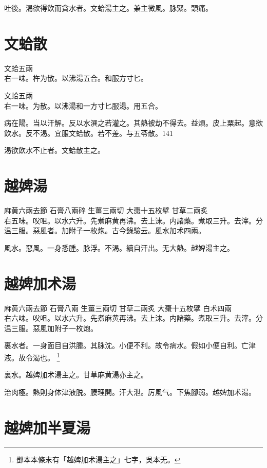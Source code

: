 吐後。渴欲得飲而貪水者。文蛤湯主之。兼主微風。脉緊。頭痛。

\section{文蛤散}

文蛤{\scriptsize 五兩}\\
右一味。杵为散。以沸湯五合。和服方寸匕。{\dengben}

文蛤{\scriptsize 五兩}\\
右一味。为散。以沸湯和一方寸匕服湯。用五合。{\zhaoben}

病在陽。当以汗解。反以水潠之若灌之。其熱被劫不得去。益煩。皮上粟起。意欲飲水。反不渴。宜服文蛤散。若不差。与五苓散。141

渴欲飲水不止者。文蛤散主之。

\section{越婢湯}

麻黄{\scriptsize 六兩去節} 石膏{\scriptsize 八兩碎} 生薑{\scriptsize 三兩切} 大棗{\scriptsize 十五枚擘} 甘草{\scriptsize 二兩炙}\\
右五味。㕮咀。以水六升。先煮麻黄{\khaai 再沸}。去上沫。内諸藥。煮取三升。去滓。分温三服。惡風者。加附子一枚炮。{\scriptsize 古今錄驗云。風水加术四兩。}

風水。惡風。一身悉腫。脉浮。不渴。續自汗出。无大熱。越婢湯主之。

\section{越婢加术湯}

麻黄{\scriptsize 六兩去節} 石膏{\scriptsize 八兩} 生薑{\scriptsize 三兩切} 甘草{\scriptsize 二兩炙} 大棗{\scriptsize 十五枚擘} 白术{\scriptsize 四兩}\\
右六味。㕮咀。以水六升。先煮麻黄再沸。去上沫。内諸藥。煮取三升。去滓。分温三服。惡風加附子一枚炮。

裏水者。一身面目自洪腫。其脉沈。小便不利。故令病水。假如小便自利。亡津液。故令渴也。
	\footnote{
		鄧本本條末有「越婢加术湯主之」七字，吳本无。
	}

裏水。越婢加术湯主之。甘草麻黄湯亦主之。

治肉極。熱則身体津{\khaai 液}脱。腠理開。汗大泄。厉風气。下焦腳弱。越婢加术湯。

\section{越婢加半夏湯}

